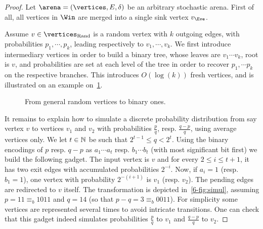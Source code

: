 \begin{proof}
Let $\arena = (\vertices,E,\delta)$ be an arbitrary stochastic
arena. First of all, all vertices in $\Win$ are merged into a single
sink vertex $v_\Eve$.

Assume $v \in \Randomvertices$ is a random vertex with $k$ outgoing
edges, with probabilities $p_1, \cdots, p_k$, leading respectively
to $v_1,\cdots,v_k$. We first introduce intermediary vertices in
order to build a binary tree, whose leaves are $v_1 \cdots v_k$,
root is $v$, and probabilities are set at each level of the tree in
order to recover $p_1, \cdots p_k$ on the respective branches. This
introduces $O(\log(k))$ fresh vertices, and is illustrated on an
example on~\cref{6-fig:gen2binary}.

\begin{figure}[htbp]
\centering
{}
\caption{From general random vertices to binary ones.}
\label{6-fig:gen2binary}
\end{figure}

It remains to explain how to simulate a discrete probability
distribution from say vertex $v$ to vertices $v_1$ and $v_2$ with
probabilities $\frac{p}{q}$, resp.  $\frac{q-p}{q}$, using average
vertices only.  We let $t \in\mathbb{N}$ be such that
$2^{t-1} \leq q < 2^{t}$. Using the binary encodings of $p$ resp.
$q-p$ as $a_1 \cdots a_t$ resp. $b_1 \cdots b_t$ (with most
significant bit first) we build the following gadget. The input
vertex is $v$ and for every $2 \leq i \leq t+1$, it has two exit
edges with accumulated probabilities $2^{-i}$. Now, if $a_i=1$
(resp.  $b_1 =1$), one vertex with probability $2^{-(i+1)}$ is $v_1$
(resp. $v_2$). The pending edges are redirected to $v$ itself. The
transformation is depicted in~\cref{6-fig:simul}, assuming
$p=11\equiv_{b} 1011$ and $q=14$ (so that
$p-q = 3 \equiv_{b} 0011$).  For simplicity some vertices are
represented several times to avoid intricate transitions. One can
check that this gadget indeed simulates probabilities $\frac p q$ to
$v_1$ and $\frac {q-p} q$ to $v_2$.


\end{proof}
